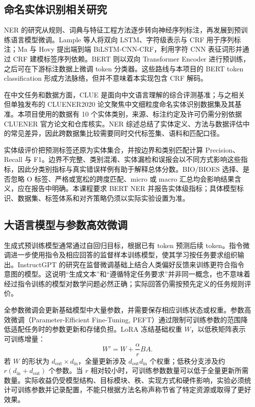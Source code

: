 \documentclass[UTF8,a4paper,12pt,fontset=none]{ctexart}
\begin{document}
\subsection{命名实体识别相关研究}
NER 的研究从规则、词典与特征工程方法逐步转向神经序列标注，再发展到预训练语言模型微调。Lample 等人将双向 LSTM、字符级表示与 CRF 用于序列标注；Ma 与 Hovy 提出端到端 BiLSTM-CNN-CRF，利用字符 CNN 表征词形并通过 CRF 建模标签序列依赖\cite{lample,mah_hovy}。BERT 则以双向 Transformer Encoder 进行预训练，之后可在下游标注数据上微调 token 分类器\cite{bert}。这些路线与本项目的 BERT token classification 形成方法脉络，但并不意味着本实现包含 CRF 解码。

在中文任务和数据方面，CLUE 是面向中文语言理解的综合评测基准；与之相关但单独发布的 CLUENER2020 论文聚焦中文细粒度命名实体识别数据集及其基准\cite{clue,cluener2020}。本项目使用的数据有 10 个实体类别，来源、标注约定及许可仍需分别依据 CLUENER 官方论文和仓库核实\cite{cluener_data}。NER 综述总结了实体定义、方法与数据评估中的常见差异，因此跨数据集比较需要同时交代标签集、语料和匹配口径\cite{ner_survey}。

实体级评价把预测标签还原为实体集合，并按边界和类别匹配计算 Precision、Recall 与 F1。边界不完整、类别混淆、实体漏检和误报会以不同方式影响这些指标，因此分类别指标与真实错误样例有助于解释总体分数。BIO/BIOES 选择、是否忽略 O 标签、严格或宽松的跨度匹配、micro 或 macro 汇总均会影响结果含义，应在报告中明确。本课程要求 BERT NER 并报告实体级指标；具体模型标识、数据集、标签体系和对齐策略仍须以实际实验设置为准。

\subsection{大语言模型与参数高效微调}
生成式预训练模型通常通过自回归目标，根据已有 token 预测后续 token。指令微调进一步使用指令及相应回答的监督样本训练模型，使其学习按任务要求组织输出。InstructGPT 的研究在监督微调基础上结合人类偏好反馈来训练更符合指令意图的模型\cite{instructgpt}。这说明“生成文本”和“遵循特定任务要求”并非同一概念，也不意味着经过指令训练的模型对数学问题必然正确；实际回答仍需按预先定义的任务规则评价。

全参数微调会更新基础模型中大量参数，并需要保存相应训练状态或权重。参数高效微调（Parameter-Efficient Fine-Tuning, PEFT）通过限制可训练参数的范围降低适配任务时的参数更新和存储负担。LoRA 冻结基础权重 $W$，以低秩矩阵表示可训练增量：
\[
  W'=W+\frac{\alpha}{r}BA.
\]
若 $W$ 的形状为 $d_{\mathrm{out}}\times d_{\mathrm{in}}$，全量更新涉及 $d_{\mathrm{out}}d_{\mathrm{in}}$ 个权重；低秩分支涉及约 $r(d_{\mathrm{in}}+d_{\mathrm{out}})$ 个参数。当 $r$ 相对较小时，可训练参数数量可以低于全量更新所需数量\cite{lora}。实际收益仍受模型结构、目标模块、秩、实现方式和硬件影响，实验必须统计可训练参数并记录配置，不能只根据方法名称声称节省了特定资源或取得了更好效果。
\end{document}
